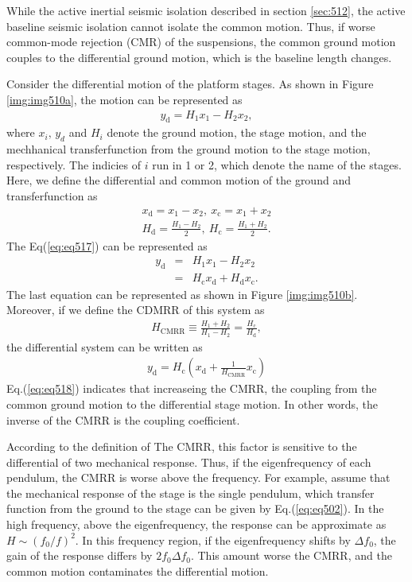 While the active inertial seismic isolation described in section \cref{sec:512}, the active baseline seismic isolation cannot isolate the common motion. Thus, if worse common-mode rejection (CMR) of the suspensions, the common ground motion couples to the differential ground motion, which is the baseline length changes.


Consider the differential motion of the platform stages. As shown in Figure \ref{img:img510a}, the motion can be represented as 
\begin{eqnarray}
  y_{\mathrm{d}} = H_1x_1-H_2x_2 \label{eq:eq517},
\end{eqnarray}
where $x_{i},\,y_{d}$ and $H_{i}$ denote the ground motion, the stage motion, and the mechhanical transferfunction from the ground motion to the stage motion, respectively. The indicies of $i$ run in 1 or 2, which denote the name of the stages. Here, we define the differential and common motion of the ground and transferfunction as 
\begin{eqnarray} \label{eq:eq517_b}
  x_{\mathrm{d}} = {x_1-x_2},\ x_{\mathrm{c}} = {x_1+x_2}  \\
  H_{\mathrm{d}} = \frac{H_1-H_2}{2},\ H_{\mathrm{c}} = \frac{H_1+H_2}{2} \label{eq:eq517_a}.
\end{eqnarray}
The Eq(\ref{eq:eq517}) can be represented as 
\begin{eqnarray}
  y_{\mathrm{d}} &=& H_1x_1-H_2x_2 \\
  &=& H_{\mathrm{c}}x_{\mathrm{d}} + H_{\mathrm{d}}x_{\mathrm{c}}\label{eq:eq516}.
\end{eqnarray}
The last equation can be represented as shown in Figure \ref{img:img510b}. Moreover, if we define the CDMRR of this system as
\begin{eqnarray}
  H_{\mathrm{CMRR}} \equiv \frac{H_1+H_2}{H_1-H_2}=\frac{H_{\mathrm{c}}}{H_{\mathrm{d}}} \label{eq:eq519},
\end{eqnarray}
the differential system can be written as 
\begin{eqnarray}
  y_{\mathrm{d}} = H_{\mathrm{c}}\left( x_{\mathrm{d}} + \frac{1}{H_{\mathrm{CMRR}}}x_{\mathrm{c}}\right) \label{eq:eq518}
\end{eqnarray}
Eq.(\ref{eq:eq518}) indicates that increaseing the CMRR, the coupling from the common ground motion to the differential stage motion. In other words, the inverse of the CMRR is the coupling coefficient.

According to the definition of The CMRR, this factor is sensitive to the differential of two mechanical response. Thus, if the eigenfrequency of each pendulum, the CMRR is worse above the frequency. For example, assume that the mechanical response of the stage is the single pendulum, which transfer function from the ground to the stage can be given by Eq.(\ref{eq:eq502}). In the high frequency, above the eigenfrequency, the response can be approximate as $H\sim{({f_0}/{f})^2}$. In this frequency region, if the eigenfrequency shifts by $\Delta{f_0}$, the gain of the response differs by $2f_0\Delta{f_0}$. This amount worse the CMRR, and the common motion contaminates the differential motion.


